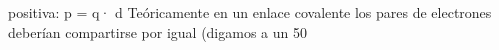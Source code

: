 \documentclass[tikz,border=2mm]{standalone}
\begin{document}
positiva: p = q· d Teóricamente en un enlace covalente los pares de electrones deberían compartirse por igual (digamos a un 50 %
\end{document}
